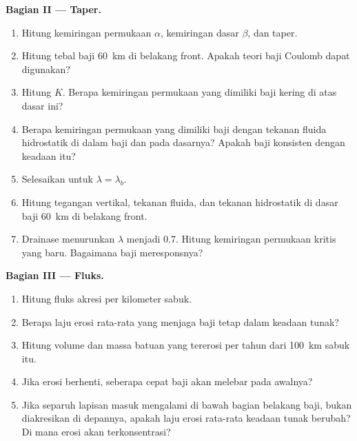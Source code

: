 \begin{problem}
\medskip\noindent\textbf{Bagian II --- Taper.}
\begin{enumerate}[resume]
  \item Hitung kemiringan permukaan $\alpha$, kemiringan dasar $\beta$, dan
        taper.
  \item Hitung tebal baji \qty{60}{km} di belakang front. Apakah teori baji Coulomb
        dapat digunakan?
  \item Hitung $K$. Berapa kemiringan permukaan yang dimiliki baji kering di atas dasar ini?
  \item Berapa kemiringan permukaan yang dimiliki baji dengan tekanan fluida hidrostatik
        di dalam baji dan pada dasarnya? Apakah baji konsisten dengan keadaan itu?
  \item Selesaikan  untuk $\lambda = \lambda_b$.
  \item Hitung tegangan vertikal, tekanan fluida, dan tekanan hidrostatik
        di dasar baji \qty{60}{km} di belakang front.
  \item Drainase menurunkan $\lambda$ menjadi 0.7. Hitung kemiringan permukaan kritis
        yang baru. Bagaimana baji meresponsnya?
\end{enumerate}

\medskip\noindent\textbf{Bagian III --- Fluks.}
\begin{enumerate}[resume]
  \item Hitung fluks akresi per kilometer sabuk.
  \item Berapa laju erosi rata-rata yang menjaga baji tetap dalam keadaan tunak?
  \item Hitung volume dan massa batuan yang tererosi per tahun dari
        \qty{100}{km} sabuk itu.
  \item Jika erosi berhenti, seberapa cepat baji akan melebar pada awalnya?
  \item Jika separuh lapisan masuk mengalami  di bawah bagian belakang
        baji, bukan diakresikan di depannya, apakah laju erosi rata-rata keadaan tunak berubah?
        Di mana erosi akan terkonsentrasi?
\end{enumerate}


\end{problem}
